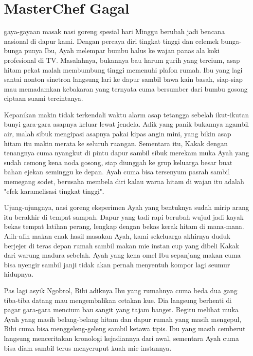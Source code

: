 \chapter*{MasterChef Gagal}


 gaya-gayaan masak nasi goreng spesial hari Minggu berubah jadi bencana nasional di dapur kami. Dengan percaya diri tingkat tinggi dan celemek bunga-bunga punya Ibu, Ayah melempar bumbu halus ke wajan panas ala koki profesional di TV. Masalahnya, bukannya bau harum gurih yang tercium, asap hitam pekat malah membumbung tinggi memenuhi plafon rumah. Ibu yang lagi santai nonton sinetron langsung lari ke dapur sambil bawa kain basah, siap-siap mau memadamkan kebakaran yang ternyata cuma bersumber dari bumbu gosong ciptaan suami tercintanya.


Kepanikan makin tidak terkendali waktu alarm asap tetangga sebelah ikut-ikutan bunyi gara-gara asapnya keluar lewat jendela. Adik yang panik bukannya ngambil air, malah sibuk mengipasi asapnya pakai kipas angin mini, yang bikin asap hitam itu makin merata ke seluruh ruangan. Sementara itu, Kakak dengan tenangnya cuma nyangkut di pintu dapur sambil sibuk merekam muka Ayah yang sudah cemong kena noda gosong, siap diunggah ke grup keluarga besar buat bahan ejekan seminggu ke depan. Ayah cuma bisa tersenyum pasrah sambil memegang sodet, berusaha membela diri kalau warna hitam di wajan itu adalah "efek karamelisasi tingkat tinggi".


Ujung-ujungnya, nasi goreng eksperimen Ayah yang bentuknya sudah mirip arang itu berakhir di tempat sampah. Dapur yang tadi rapi berubah wujud jadi kayak bekas tempat latihan perang, lengkap dengan bekas kerak hitam di mana-mana. Alih-alih makan enak hasil masakan Ayah, kami sekeluarga akhirnya duduk berjejer di teras depan rumah sambil makan mie instan cup yang dibeli Kakak dari warung madura sebelah. Ayah yang kena omel Ibu sepanjang makan cuma bisa nyengir sambil janji tidak akan pernah menyentuh kompor lagi seumur hidupnya.


Pas lagi asyik Ngobrol, Bibi adiknya Ibu yang rumahnya cuma beda dua gang tiba-tiba datang mau mengembalikan cetakan kue. Dia langsung berhenti di pagar gara-gara mencium bau sangit yang tajam banget. Begitu melihat muka Ayah yang masih belang-belang hitam dan dapur rumah yang masih mengepul, Bibi cuma bisa menggeleng-geleng sambil ketawa tipis. Ibu yang masih cemberut langsung menceritakan kronologi kejadiannya dari awal, sementara Ayah cuma bisa diam sambil terus menyeruput kuah mie instannya.


